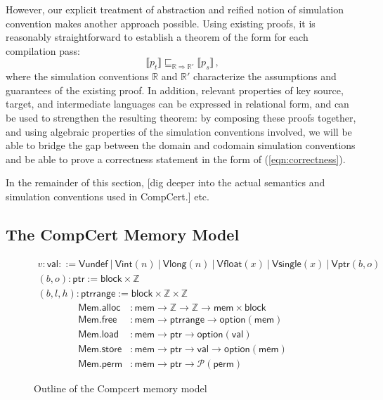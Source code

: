 \documentclass[acmsmall,timestamp,review]{acmart}
\newcommand{\kw}[1]{\ensuremath{ \mathsf{#1} }}
\newcommand{\alt}{\ |\ } %
\begin{document}
However,
our explicit treatment of abstraction
and reified notion of simulation convention
makes another approach possible.
Using existing proofs, it is reasonably straightforward
to establish a theorem of the form
for each compilation pass:
\begin{equation}
    \label{correctness-alt}
    \llbracket p_t \rrbracket
    \sqsubseteq_{\mathbb{R} \Rightarrow \mathbb{R}'}
    \llbracket p_s \rrbracket \,,
\end{equation}
where the simulation conventions $\mathbb{R}$ and $\mathbb{R}'$
characterize the assumptions and guarantees
of the existing proof.
In addition,
relevant properties of key source, target, and intermediate languages
can be expressed in relational form,
and can be used to strengthen the resulting theorem:
by composing these proofs together,
and using algebraic properties of
the simulation conventions involved,
we will be able to bridge the gap
between the domain and codomain simulation conventions
and be able to prove a correctness statement
in the form of (\ref{eqn:correctness}).

In the remainder of this section,
[dig deeper into the actual semantics and
simulation conventions used in CompCert.]
etc.


\subsection{The CompCert Memory Model} \label{sec:compcert:mm} %

\begin{figure} %
  \begin{gather*}
    v : \kw{val} ::=
      \kw{Vundef} \alt
      \kw{Vint}(n) \alt
      \kw{Vlong}(n) \alt
      \kw{Vfloat}(x) \alt
      \kw{Vsingle}(x) \alt
      \kw{Vptr}(b, o)
    \\
    (b, o) : \kw{ptr} :=
      \kw{block} \times \mathbb{Z}
    \\
    (b, l, h) : \kw{ptrrange} :=
      \kw{block} \times \mathbb{Z} \times \mathbb{Z}
  \end{gather*}
  \begin{align*}
    \kw{Mem.alloc} &:
      \kw{mem} \rightarrow \mathbb{Z} \rightarrow \mathbb{Z} \rightarrow
      \kw{mem} \times \kw{block}
    \\
    \kw{Mem.free} &:
      \kw{mem} \rightarrow
      \kw{ptrrange} \rightarrow
      \kw{option}(\kw{mem})
    \\
    \kw{Mem.load} &:
      \kw{mem} \rightarrow \kw{ptr} \rightarrow \kw{option}(\kw{val})
    \\
    \kw{Mem.store} &:
      \kw{mem} \rightarrow \kw{ptr} \rightarrow \kw{val} \rightarrow \kw{option}(\kw{mem})
    \\
    \kw{Mem.perm} &:
      \kw{mem} \rightarrow \kw{ptr} \rightarrow \mathcal{P}(\kw{perm})
  \end{align*}
  \caption{Outline of the Compcert memory model}
  \label{fig:mm}
\end{figure}
\end{document}
